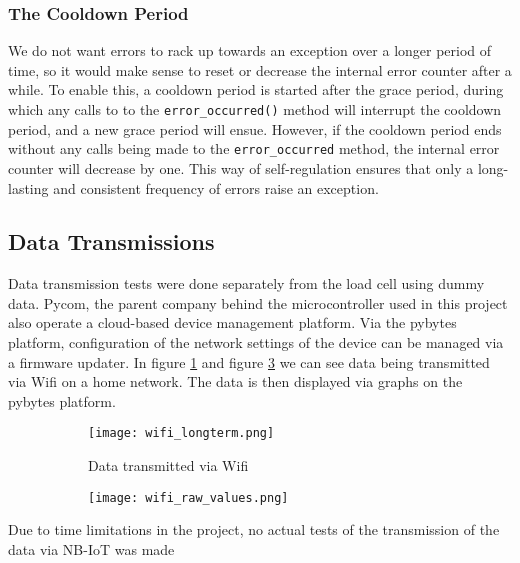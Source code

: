 \subsubsection{The Cooldown Period}
We do not want errors to rack up towards an exception over a longer period of time, so it would make sense to reset or decrease the internal error counter after a while. To enable this, a cooldown period is started after the grace period, during which any calls to to the \lstinline{error_occurred()} method will interrupt the cooldown period, and a new grace period will ensue. However, if the cooldown period ends without any calls being made to the \lstinline{error_occurred} method, the internal error counter will decrease by one. This way of self-regulation ensures that only a long-lasting and consistent frequency of errors raise an exception.


\subsection{Data Transmissions}
Data transmission tests were done separately from the load cell using dummy data. Pycom, the parent company behind the microcontroller used in this project also operate a cloud-based device management platform. \cite{pybytes-website} Via the pybytes platform, configuration of the network settings of the device can be managed via a firmware updater. 
In figure \ref{fig:wifi_longterm} and figure \ref{fig:wifi_raw_values} we can see data being transmitted via Wifi on a home network. The data is then displayed via graphs on the pybytes platform.

\begin{figure}[H]
\centering
	\begin{subfigure}[b]{0.3\textwidth}
    \texttt{[image: wifi\_longterm.png]}
    \caption{Data transmitted via Wifi}
    \label{fig:wifi_longterm}
	\end{subfigure}
	\begin{subfigure}[b]{0.3\textwidth}
    \texttt{[image: wifi\_raw\_values.png]}
    \caption{}
    \label{fig:wifi_raw_values}
	\end{subfigure}
\end{figure}

Due to time limitations in the project, no actual tests of the transmission of the data via NB-IoT was made 